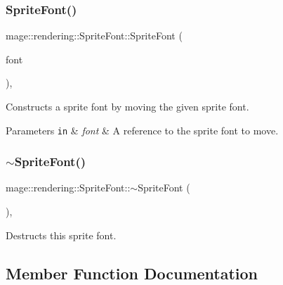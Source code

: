 \subsubsection{\texorpdfstring{Sprite\+Font()}{SpriteFont()}\hspace{0.1cm}{\footnotesize\ttfamily [3/3]}}
{\footnotesize\ttfamily mage\+::rendering\+::\+Sprite\+Font\+::\+Sprite\+Font (\begin{DoxyParamCaption}\item[{\hyperlink{classmage_1_1rendering_1_1_sprite_font}{Sprite\+Font} \&\&}]{font }\end{DoxyParamCaption})\hspace{0.3cm}{\ttfamily [default]}, {\ttfamily [noexcept]}}

Constructs a sprite font by moving the given sprite font.


\begin{DoxyParams}[1]{Parameters}
\mbox{\tt in}  & {\em font} & A reference to the sprite font to move. \\
\hline
\end{DoxyParams}
\hypertarget{classmage_1_1rendering_1_1_sprite_font_a51ec0418e1456d7634c6540ccc801644}{}\label{classmage_1_1rendering_1_1_sprite_font_a51ec0418e1456d7634c6540ccc801644} 
\subsubsection{\texorpdfstring{$\sim$\+Sprite\+Font()}{~SpriteFont()}}
{\footnotesize\ttfamily mage\+::rendering\+::\+Sprite\+Font\+::$\sim$\+Sprite\+Font (\begin{DoxyParamCaption}{ }\end{DoxyParamCaption})\hspace{0.3cm}{\ttfamily [virtual]}, {\ttfamily [default]}}

Destructs this sprite font. 

\subsection{Member Function Documentation}
\hypertarget{classmage_1_1rendering_1_1_sprite_font_a6f9adb6806acc990ac3feaa547f7f296}{}\label{classmage_1_1rendering_1_1_sprite_font_a6f9adb6806acc990ac3feaa547f7f296} 

